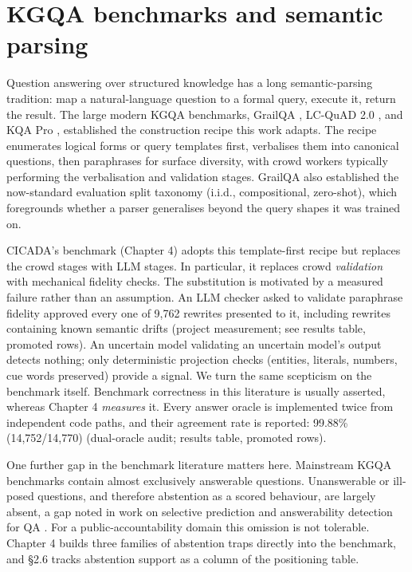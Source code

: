 \documentclass[10pt]{article} %
\begin{document}
\section{KGQA benchmarks and semantic parsing}\label{sec:kgqa-benchmarks-and-semantic-parsing}

Question answering over structured knowledge has a long semantic-parsing tradition: map a natural-language question to a formal query, execute it, return the result. The large modern KGQA benchmarks, GrailQA \citep{gu2023pangu}, LC-QuAD 2.0 \citep{dubey2019lcquad2}, and KQA Pro \citep{cao2022kqapro}, established the construction recipe this work adapts. The recipe enumerates logical forms or query templates first, verbalises them into canonical questions, then paraphrases for surface diversity, with crowd workers typically performing the verbalisation and validation stages. GrailQA also established the now-standard evaluation split taxonomy (i.i.d., compositional, zero-shot), which foregrounds whether a parser generalises beyond the query shapes it was trained on.

CICADA's benchmark (Chapter 4) adopts this template-first recipe but replaces the crowd stages with LLM stages. In particular, it replaces crowd \emph{validation} with mechanical fidelity checks. The substitution is motivated by a measured failure rather than an assumption. An LLM checker asked to validate paraphrase fidelity approved every one of 9,762 rewrites presented to it, including rewrites containing known semantic drifts (project measurement; see results table, promoted rows). An uncertain model validating an uncertain model's output detects nothing; only deterministic projection checks (entities, literals, numbers, cue words preserved) provide a signal. We turn the same scepticism on the benchmark itself. Benchmark correctness in this literature is usually asserted, whereas Chapter 4 \emph{measures} it. Every answer oracle is implemented twice from independent code paths, and their agreement rate is reported: 99.88\% (14,752/14,770) (dual-oracle audit; results table, promoted rows).

One further gap in the benchmark literature matters here. Mainstream KGQA benchmarks contain almost exclusively answerable questions. Unanswerable or ill-posed questions, and therefore abstention as a scored behaviour, are largely absent, a gap noted in work on selective prediction and answerability detection for QA \citep{rajpurkar2018squad2,kamath2020selective}. For a public-accountability domain this omission is not tolerable. Chapter 4 builds three families of abstention traps directly into the benchmark, and \S2.6 tracks abstention support as a column of the positioning table.
\end{document}
